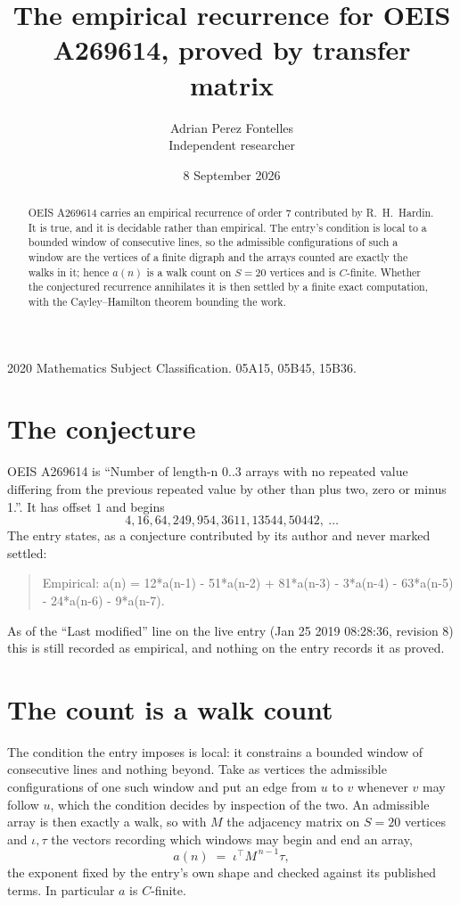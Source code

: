 \documentclass[11pt,a4paper]{article}
\title{The empirical recurrence for OEIS A269614, proved by transfer matrix}
\author{Adrian Perez Fontelles\\ \small Independent researcher}
\date{8 September 2026}
\theoremstyle{plain}
\theoremstyle{definition}
\begin{document}
\maketitle

\begin{abstract}
OEIS A269614 carries an empirical recurrence of order $7$ contributed by R.~H.~Hardin. It is
true, and it is decidable rather than empirical. The entry's condition is local to a bounded window of consecutive lines, so
the admissible configurations of such a window are the vertices of a finite digraph and the
arrays counted are exactly the walks in it; hence $a(n)$ is a walk count on $S=20$ vertices
and is $C$-finite. Whether the conjectured recurrence annihilates it is then settled by a
finite exact computation, with the Cayley--Hamilton theorem bounding the work.
\end{abstract}

\noindent\small 2020 Mathematics Subject Classification. 05A15, 05B45, 15B36.\normalsize

\section{The conjecture}

OEIS A269614 is ``Number of length-n 0..3 arrays with no repeated value differing from the previous repeated value by other than plus two, zero or minus 1.''. It has offset $1$ and begins
\[
4, 16, 64, 249, 954, 3611, 13544, 50442,\ \dots
\]
The entry states, as a conjecture contributed by its author and never marked settled:
\begin{quote}
Empirical: a(n) = 12*a(n-1) - 51*a(n-2) + 81*a(n-3) - 3*a(n-4) - 63*a(n-5) - 24*a(n-6) - 9*a(n-7).
\end{quote}
As of the ``Last modified'' line on the live entry (Jan 25 2019 08:28:36, revision 8) this is still
recorded as empirical, and nothing on the entry records it as proved.

\section{The count is a walk count}

The condition the entry imposes is local: it constrains a bounded window of consecutive lines and nothing beyond. Take as
vertices the admissible configurations of one such window and put an edge from $u$ to $v$
whenever $v$ may follow $u$, which the condition decides by inspection of the two. An
admissible array is then exactly a walk, so with $M$ the adjacency matrix on $S=20$ vertices
and $\iota,\tau$ the vectors recording which windows may begin and end an array,
\[
a(n)\;=\;\iota^{\!\top}M^{\,n-1}\tau ,
\]
the exponent fixed by the entry's own shape and checked against its published terms. In
particular $a$ is $C$-finite.
\end{document}
